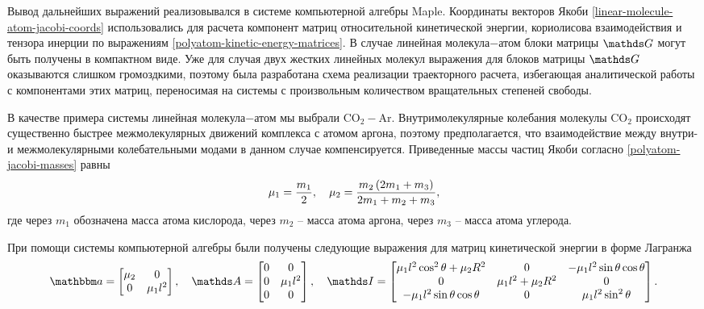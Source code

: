 Вывод дальнейших выражений реализовывался в системе компьютерной алгебры Maple. Координаты векторов Якоби \eqref{linear-molecule-atom-jacobi-coords} использовались для расчета компонент матриц относительной кинетической энергии, кориолисова взаимодействия и тензора инерции по выражениям \eqref{polyatom-kinetic-energy-matrices}. В случае линейная молекула$-$атом блоки матрицы $\bbG$ могут быть получены в компактном виде. Уже для случая двух жестких линейных молекул выражения для блоков матрицы $\bbG$ оказываются слишком громоздкими, поэтому была разработана схема реализации траекторного расчета, избегающая аналитической работы с компонентами этих матриц, переносимая на системы с произвольным количеством вращательных степеней свободы. \par
В качестве примера системы линейная молекула$-$атом мы выбрали CO$_2-$Ar. Внутримолекулярные колебания молекулы CO$_2$ происходят существенно быстрее межмолекулярных движений комплекса с атомом аргона, поэтому предполагается, что взаимодействие между внутри- и межмолекулярными колебательными модами в данном случае компенсируется. Приведенные массы частиц Якоби согласно \eqref{polyatom-jacobi-masses} равны
\begin{gather}
    \mu_1 = \frac{m_1}{2}, \quad \mu_2 = \frac{m_2 \left( 2 m_1 + m_3 \right)}{2 m_1 + m_2 + m_3},
\end{gather}
% 
где через $m_1$ обозначена масса атома кислорода, через $m_2$ -- масса атома аргона, через $m_3$ -- масса атома углерода. \par
При помощи системы компьютерной алгебры были получены следующие выражения для матриц кинетической энергии в форме Лагранжа
\begin{gather}
	\bba =
	\begin{bmatrix}
		\mu_2 & 0 \\
		0 & \mu_1 l^2
	\end{bmatrix}, \quad 
	\bbA = 
	\begin{bmatrix}
		0 & 0 \\
		0 & \mu_1 l^2 \\
		0 & 0 
	\end{bmatrix}, \quad
	\bbI = 
	\begin{bmatrix}
		\mu_1 l^2 \cos^2 \theta + \mu_2 R^2 & 0 & -\mu_1 l^2 \sin \theta \cos \theta \\
		0 & \mu_1 l^2 + \mu_2 R^2 & 0 \\
		- \mu_1 l^2 \sin \theta \cos \theta & 0 & \mu_1 l^2 \sin^2 \theta
	\end{bmatrix}. \notag
\end{gather}

